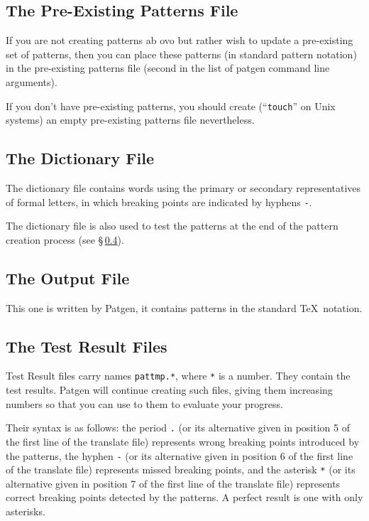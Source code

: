 \documentclass{article}
\begin{document}
\subsection{The Pre-Existing Patterns File}

If you are not creating patterns ab ovo but rather wish to update a pre-existing set of patterns, then you can place these patterns (in standard pattern notation) in the pre-existing patterns file (second in the list of patgen command line arguments).

If you don't have pre-existing patterns, you should create (``\texttt{touch}'' on Unix systems) an empty pre-existing patterns file nevertheless.

\subsection{The Dictionary File}

The dictionary file contains words using the primary or secondary representatives of formal letters, in which breaking points are indicated by hyphens \texttt{-}.

The dictionary file is also used to test the patterns at the end of the pattern creation process (see \S\,\ref{test}). 

\subsection{The Output File}

This one is written by Patgen, it contains patterns in the standard \TeX\ notation.

\subsection{The Test Result Files}\label{test}

Test Result files carry names \texttt{pattmp.*}, where \texttt{*} is a number. They contain the test results. Patgen will continue creating such files, giving them increasing numbers so that you can use to them to evaluate your progress.

Their syntax is as follows: the period \texttt{.} (or its alternative given in position 5 of the first line of the translate file) represents wrong breaking points introduced by the patterns, the hyphen \texttt{-} (or its alternative given in position 6 of the first line of the translate file) represents missed breaking points, and the asterisk \texttt{*} (or its alternative given in position 7 of the first line of the translate file) represents correct breaking points detected by the patterns. A perfect result is one with only asterisks.
\end{document}
